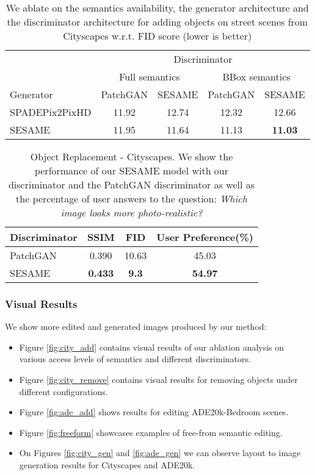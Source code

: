 \documentclass[runningheads]{llncs}
\begin{document}
\begin{table}[t]
\centering
\caption{We ablate on the semantics availability, the generator architecture and the discriminator architecture for adding objects on street scenes from Cityscapes w.r.t. FID score (lower is better) }
\label{table:ablation}
\begin{tabular}{l|cc|cc}
\multicolumn{1}{l}{} &  \multicolumn{4}{c}{Discriminator} \\
\multicolumn{1}{l}{} &  \multicolumn{2}{c|}{Full semantics} & \multicolumn{2}{c}{BBox semantics} \\
\cline{2-5}
Generator & PatchGAN & SESAME & PatchGAN & SESAME \\
\hline
SPADEPix2PixHD & 11.92 & 12.74 & 12.32 & 12.66 \\ 
SESAME & 11.95 & 11.64 & 11.13 & \textbf{11.03} \\
\end{tabular}
\end{table}

\begin{table*}
\centering
\caption{Object Replacement - Cityscapes. We show the performance of our SESAME model with our discriminator and the PatchGAN\cite{isola2017image,park2019SPADE} discriminator as well as the percentage of user answers to the question: \textit{Which image looks more photo-realistic?}}
\begin{tabular}{l|cc|c}
Discriminator & SSIM & FID & User Preference(\%) \\
\hline
PatchGAN &  0.390 & 10.63 & 45.03 \\
SESAME & \textbf{0.433} & \textbf{9.3} & \textbf{54.97} \\
\end{tabular}
\label{table:replacement}
\end{table*}



\subsubsection{Visual Results}

We show more edited and generated images produced by our method:

\begin{itemize}
    \item Figure \ref{fig:city_add} contains visual results of our ablation analysis on various access levels of semantics and different discriminators.
    \item Figure \ref{fig:city_remove} contains visual results for removing objects under different configurations.   
    \item Figure \ref{fig:ade_add} shows results for editing ADE20k-Bedroom scenes\cite{zhou2017scene,zhou2016semantic}.
    \item Figure \ref{fig:freeform} showcases examples of free-from semantic editing.   
    \item On Figures \ref{fig:city_gen} and \ref{fig:ade_gen} we can observe layout to image generation results for Cityscapes and ADE20k.   
\end{itemize}
\end{document}

